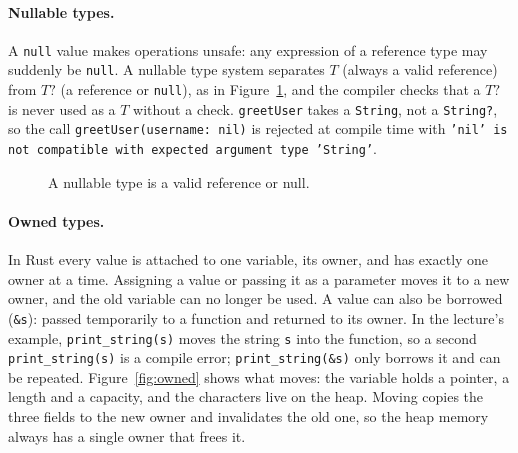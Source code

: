 \paragraph{Nullable types.} A \texttt{null} value makes operations unsafe: any
expression of a reference type may suddenly be \texttt{null}. A nullable type
system separates $T$ (always a valid reference) from $T?$ (a reference or
\texttt{null}), as in Figure~\ref{fig:nullable}, and the compiler checks that
a $T?$ is never used as a $T$ without a check.
\texttt{greetUser} takes a \texttt{String}, not a \texttt{String?}, so the call
\texttt{greetUser(username: nil)} is rejected at compile time with
\texttt{'nil' is not compatible with expected argument type 'String'}.

\begin{figure}[h]
\centering
{}
\caption{A nullable type is a valid reference or null.}
\label{fig:nullable}
\end{figure}

\paragraph{Owned types.} In Rust every value is attached to one variable, its
owner, and has exactly one owner at a time. Assigning a value or passing it as
a parameter moves it to a new owner, and the old variable can no longer be
used. A value can also be borrowed (\texttt{\&s}): passed temporarily to a
function and returned to its owner. In the lecture's example,
\texttt{print\_string(s)} moves the string \texttt{s} into the function, so a
second \texttt{print\_string(s)} is a compile error; \texttt{print\_string(\&s)}
only borrows it and can be repeated. Figure~\ref{fig:owned} shows what moves:
the variable holds a pointer, a length and a capacity, and the characters live
on the heap. Moving copies the three fields to the new owner and invalidates
the old one, so the heap memory always has a single owner that frees it.


